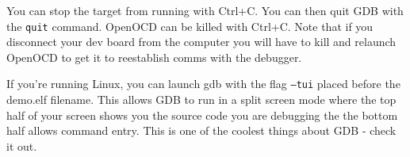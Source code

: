 You can stop the target from running with Ctrl+C. You can then quit GDB with the \texttt{quit} command. OpenOCD can be killed with Ctrl+C. Note that if you disconnect your dev board from the computer you will have to kill and relaunch OpenOCD to get it to reestablish comms with the debugger.

If you're running Linux, you can launch gdb with the flag \texttt{--tui} placed before the demo.elf filename. This allows GDB to run in a split screen mode where the top half of your screen shows you the source code you are debugging the the bottom half allows command entry. This is one of the coolest things about GDB - check it out.
